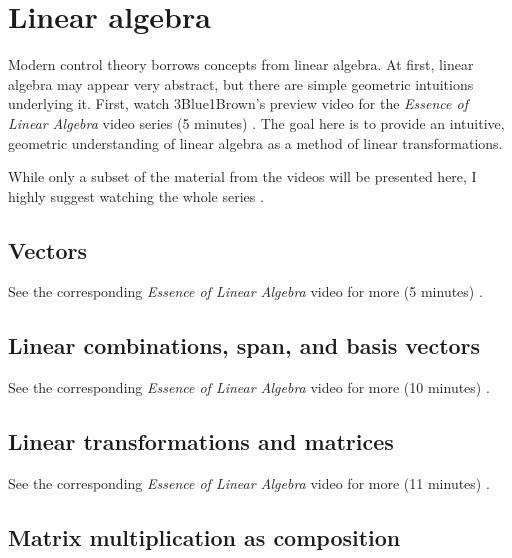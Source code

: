 
\chapter{Linear algebra}

Modern control theory borrows concepts from linear algebra. At first, linear
algebra may appear very abstract, but there are simple geometric intuitions
underlying it. First, watch 3Blue1Brown's preview video for the
\textit{Essence of Linear Algebra} video series (5 minutes)
\cite{bib:linalg_preview}. The goal here is to provide an intuitive, geometric
understanding of linear algebra as a method of linear transformations.

While only a subset of the material from the videos will be presented here, I
highly suggest watching the whole series \cite{bib:essence_of_linalg}.

\section{Vectors}

\begin{remark}
  See the corresponding \textit{Essence of Linear Algebra} video for more (5
  minutes) \cite{bib:linalg_vectors}.
\end{remark}

\section{Linear combinations, span, and basis vectors}

\begin{remark}
  See the corresponding \textit{Essence of Linear Algebra} video for more (10
  minutes) \cite{bib:linalg_linear_combinations}.
\end{remark}

\section{Linear transformations and matrices}

\begin{remark}
  See the corresponding \textit{Essence of Linear Algebra} video for more (11
  minutes) \cite{bib:linalg_linear_transformations_and_matrices}.
\end{remark}

\section{Matrix multiplication as composition}

